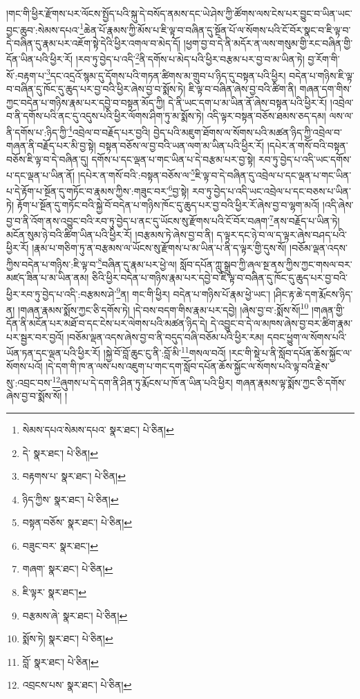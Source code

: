 །གང་གི་ཕྱིར་རྫོགས་པར་ལོངས་སྤྱོད་པའི་སྐུ་དེ་བསོད་ནམས་དང་ཡེ་ཤེས་ཀྱི་ཚོགས་ལས་ངེས་པར་བྱུང་བ་ཡིན་ཡང་བྱང་ཆུབ་:སེམས་དཔའ་\footnote{སེམས་དཔའ་སེམས་དཔའ་  སྣར་ཐང་།  པེ་ཅིན། }ཆེན་པོ་རྣམས་ཀྱི་མོས་པ་ཇི་ལྟ་བ་བཞིན་དུ་སྔོན་པོ་ལ་སོགས་པའི་ངོ་བོར་སྣང་བ་ཇི་ལྟ་བ་དེ་བཞིན་དུ་རྣམ་པར་འཇོག་སྟེ་དེའི་ཕྱིར་འགལ་བ་མེད་དོ། །ཕྱག་བྱ་བ་དེ་ནི་མདོར་ན་ལས་གསུམ་གྱི་རང་བཞིན་གྱི་དོན་ཡིན་པའི་ཕྱིར་རོ། །རབ་ཏུ་བྱེད་པ་འདི་\footnote{དེ་  སྣར་ཐང་།  པེ་ཅིན། }ནི་དགོས་པ་མེད་པའི་ཕྱིར་བརྩམ་པར་བྱ་བ་མ་ཡིན་ཏེ། བྱ་རོག་གི་སོ་:བརྟག་པ་\footnote{བརྟགས་པ་  སྣར་ཐང་།  པེ་ཅིན། }དང་འདྲའོ་སྙམ་དུ་དོགས་པའི་གཏན་ཚིགས་མ་གྲུབ་པ་ཉིད་དུ་བསྟན་པའི་ཕྱིར། བདེན་པ་གཉིས་ཇི་ལྟ་བ་བཞིན་དུ་ཁོང་དུ་ཆུད་པར་བྱ་བའི་ཕྱིར་ཞེས་བྱ་བ་སྨོས་ཏེ། ཇི་ལྟ་བ་བཞིན་ཞེས་བྱ་བའི་ཚིག་ནི། གཞན་དག་གིས་ཀྱང་བདེན་པ་གཉིས་རྣམ་པར་དབྱེ་བ་བསྟན་མོད་ཀྱི། དེ་ནི་ཡང་དག་པ་མ་ཡིན་ནོ་ཞེས་བསྟན་པའི་ཕྱིར་རོ། །འབྲེལ་བ་ནི་དགོས་པའི་ནང་དུ་འདུས་པའི་ཕྱིར་ལོགས་ཤིག་ཏུ་མ་སྨོས་ཏེ། འདི་ལྟར་བསྟན་བཅོས་ཐམས་ཅད་དམ། ལས་ལ་ནི་དགོས་པ་:ཉིད་ཀྱི་\footnote{ཉིད་ཀྱིས་  སྣར་ཐང་།  པེ་ཅིན། }འབྲེལ་བ་བརྗོད་པར་བྱའི། བྱེད་པའི་མཇུག་ཐོགས་ལ་སོགས་པའི་མཚན་ཉིད་ཀྱི་འབྲེལ་བ་གཞན་ནི་བརྗོད་པར་མི་བྱ་སྟེ། བསྟན་བཅོས་ལ་བྱ་བའི་ཡན་ལག་མ་ཡིན་པའི་ཕྱིར་རོ། །དཔེར་ན་གསོ་བའི་བསྟན་བཅོས་ཇི་ལྟ་བ་དེ་བཞིན་དུ། དགོས་པ་དང་ལྡན་པ་གང་ཡིན་པ་དེ་བརྩམ་པར་བྱ་སྟེ། རབ་ཏུ་བྱེད་པ་འདི་ཡང་དགོས་པ་དང་ལྡན་པ་ཡིན་ནོ། །དཔེར་ན་གསོ་བའི་:བསྟན་བཅོས་ལ་\footnote{བསྟན་བཅོས་  སྣར་ཐང་།  པེ་ཅིན། }ཇི་ལྟ་བ་དེ་བཞིན་དུ་འབྲེལ་པ་དང་ལྡན་པ་གང་ཡིན་པ་དེ་རྟོག་པ་སྔོན་དུ་གཏོང་བ་རྣམས་ཀྱིས་:གཟུང་བར་\footnote{བཟུང་བར་  སྣར་ཐང་། }བྱ་སྟེ། རབ་ཏུ་བྱེད་པ་འདི་ཡང་འབྲེལ་པ་དང་བཅས་པ་ཡིན་ཏེ། རྟོག་པ་སྔོན་དུ་གཏོང་བའི་སྐྱེ་བོ་བདེན་པ་གཉིས་ཁོང་དུ་ཆུད་པར་བྱ་བའི་ཕྱིར་རོ་ཞེས་བྱ་བ་ལྷག་མའོ། །འདི་ཞེས་བྱ་བ་ནི་འོག་ནས་འབྱུང་བའི་རབ་ཏུ་བྱེད་པ་ནང་དུ་ཡོངས་སུ་རྫོགས་པའི་ངོ་བོར་བཞག་\footnote{གཞག་  སྣར་ཐང་།  པེ་ཅིན། }ནས་བརྗོད་པ་ཡིན་ཏེ། མངོན་སུམ་ཉེ་བའི་ཚིག་ཡིན་པའི་ཕྱིར་རོ། །བརྩམས་ཏེ་ཞེས་བྱ་བ་ནི། ད་ལྟར་དང་ཉེ་བ་ལ་ད་ལྟར་ཞེས་བཤད་པའི་ཕྱིར་རོ། །རྣམ་པ་གཅིག་ཏུ་ན་བརྩམས་ལ་ཡོངས་སུ་རྫོགས་པ་མ་ཡིན་པ་ནི་ད་ལྟར་གྱི་དུས་སོ། །བཅོམ་ལྡན་འདས་ཀྱིས་བདེན་པ་གཉིས་:ཇི་ལྟ་བ་\footnote{ཇི་ལྟར་  སྣར་ཐང་། }བཞིན་དུ་རྣམ་པར་ཕྱེ་ལ། སློབ་དཔོན་ཀླུ་སྒྲུབ་ཀྱི་ཞལ་སྔ་ནས་ཀྱིས་ཀྱང་གསལ་བར་མཛད་ཟིན་པ་མ་ཡིན་ནམ། ཅིའི་ཕྱིར་བདེན་པ་གཉིས་རྣམ་པར་དབྱེ་བ་ཇི་ལྟ་བ་བཞིན་དུ་ཁོང་དུ་ཆུད་པར་བྱ་བའི་ཕྱིར་རབ་ཏུ་བྱེད་པ་འདི་:བརྩམས་ཤེ་\footnote{བརྩམས་ཞེ་  སྣར་ཐང་།  པེ་ཅིན། }ན། གང་གི་ཕྱིར། བདེན་པ་གཉིས་པོ་རྣམ་ཕྱེ་ཡང་། །ཤིང་རྟ་ཆེ་དག་རྨོངས་ཉིད་ན། །གཞན་རྣམས་སྨོས་ཀྱང་ཅི་དགོས་ཏེ། །དེ་བས་བདག་གིས་རྣམ་པར་དབྱེ། །ཞེས་བྱ་བ་:སྨོས་སོ།\footnote{སྨོས་ཏེ།  སྣར་ཐང་།  པེ་ཅིན། } །གཞན་གྱི་དོན་ནི་མངོན་པར་མཐོ་བ་དང་ངེས་པར་ལེགས་པའི་མཚན་ཉིད་དེ། དེ་འབྱུང་བ་དེ་ལ་མཁས་ཞེས་བྱ་བར་ཚིག་རྣམ་པར་སྦྱར་བར་བྱའོ། །བཅོམ་ལྡན་འདས་ཞེས་བྱ་བ་ནི་བདུད་བཞི་བཅོམ་པའི་ཕྱིར་རམ། དབང་ཕྱུག་ལ་སོགས་པའི་ཡོན་ཏན་དང་ལྡན་པའི་ཕྱིར་རོ། །སྐྱེ་བོ་བློ་ཆུང་ངུ་ནི་:བློ་མི་\footnote{བློ་  སྣར་ཐང་།  པེ་ཅིན། }གསལ་བའོ། །རང་གི་སྡེ་པ་ནི་སློབ་དཔོན་ཆོས་སྐྱོང་ལ་སོགས་པའོ། །དེ་དག་གི་ཁ་ན་ལས་པས་འཇུག་པ་གང་དག་སློབ་དཔོན་ཆོས་སྐྱོང་ལ་སོགས་པའི་ལྟ་བའི་རྗེས་སུ་:འབྲང་བས་\footnote{འབྲངས་པས་  སྣར་ཐང་།  པེ་ཅིན། }ཞུགས་པ་དེ་དག་ནི་ཤིན་ཏུ་རྨོངས་པ་ཁོ་ན་ཡིན་པའི་ཕྱིར། གཞན་རྣམས་ལྟ་སྨོས་ཀྱང་ཅི་དགོས་ཞེས་བྱ་བ་སྨོས་སོ། །
